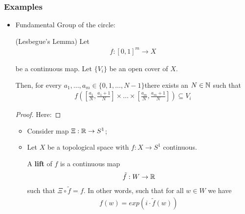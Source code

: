 \documentclass[Total.tex]{subfiles}
\begin{document}
				\subsubsection{Examples}
				\begin{itemize}
					\item Fundamental Group of the circle:
					\begin{lemma}
						(Lesbegue's Lemma) Let
						\begin{gather*}
							f:[0,1]^m\rightarrow X
						\end{gather*}
						
						be a continuous map. Let $\{V_i\}$ be an open cover of $X$. 
						
						Then, for every $a_1,\dots,a_m\in \{0,1,\dots,N-1\}$there exists an $N\in \mathbb{N}$ such that
						\begin{gather*}
							f([\frac{a_1}{N},\frac{a_1+1}{N}]\times\dots\times [\frac{a_m}{N},\frac{a_m+1}{N}])\subseteq V_i
						\end{gather*}
					\end{lemma}
					\begin{proof}
						Here: 
					\end{proof}
					\begin{Def}
						\begin{itemize}
							\item Consider map $\Xi:\mathbb{R}\rightarrow S^1$;
							\item Let $X$ be a topological space with $f:X\rightarrow S^1$ continuous.
							
							A \textbf{lift} of $f$ is a continuous map
							\begin{gather*}
								\tilde{f}:W\rightarrow \mathbb{R}
							\end{gather*}
							such that $\Xi\circ \tilde{f}=f$. In other words, such that for all $w\in W$ we have
							\begin{gather*}
								f(w)=exp(i\cdot \tilde{f}(w))
							\end{gather*}
							\begin{center}
							\end{center}
						\end{itemize}
					\end{Def}
					

\end{itemize}
\end{document}
